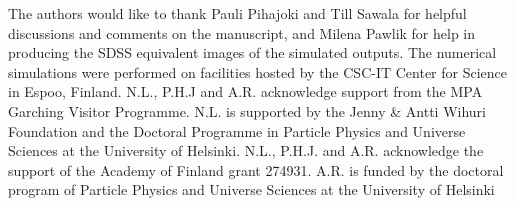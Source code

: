 \documentclass[a4paper,fleqn,usenatbib]{mnras}
\begin{document}
The authors would like to thank  Pauli Pihajoki and Till Sawala for helpful discussions and comments on the manuscript, and Milena Pawlik
for help in producing the SDSS equivalent images of the simulated outputs. The numerical simulations were
performed on facilities hosted by the CSC-IT Center for Science in Espoo, Finland.
N.L.,  P.H.J and A.R. acknowledge support from the MPA Garching Visitor Programme.
N.L. is supported by the Jenny \& Antti Wihuri Foundation and the Doctoral Programme
in Particle Physics and Universe Sciences at the University of Helsinki.
N.L., P.H.J. and A.R. acknowledge the support of the Academy of Finland grant 274931.
A.R. is funded by the doctoral program of Particle Physics and Universe Sciences at the University of Helsinki















\bsp	%
\label{lastpage}
\end{document}

